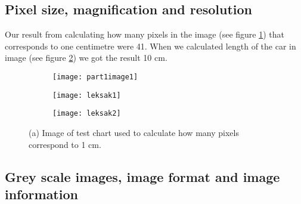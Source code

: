 \subsection{Pixel size, magnification and resolution}
Our result from calculating how many pixels in the image (see figure \ref{fig:TestChart}) that corresponds to one centimetre were 41. When we calculated length of the car in image (see figure \ref{fig:Toy1}) we got the result 10 cm. 

\begin{figure}[h]
	\centering
	\begin{subfigure}[b]{0.3\textwidth}
		\texttt{[image: part1image1]}
		\caption{}
		\label{fig:TestChart}
	\end{subfigure}
	\begin{subfigure}[b]{0.3\textwidth}
		\texttt{[image: leksak1]}
		\caption{}
		\label{fig:Toy1}
	\end{subfigure}
	\begin{subfigure}[b]{0.3\textwidth}
		\texttt{[image: leksak2]}
		\caption{}
		\label{fig:Toy2}
	\end{subfigure}
	\caption{(a) Image of test chart used to calculate how many pixels correspond to 1 cm.}
	\label{fig:part1}
\end{figure}
\subsection{Grey scale images, image format and image information}
